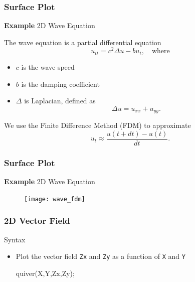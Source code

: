 \documentclass{beamer}  %
\begin{document}
\begin{frame}[fragile]
\frametitle{Surface Plot}
\textbf{Example} 2D Wave Equation

The wave equation is a partial differential equation
\begin{equation}\label{eq:wave_eq}
   u_{tt} = c^2 \Delta u - b u_t,\quad \mbox{where}
\end{equation}\pause
\begin{itemize}
    \item $c$ is the wave speed
    \item $b$ is the damping coefficient
    \item $\Delta$ is Laplacian, defined as
          \begin{equation}
          \Delta u = u_{xx} + u_{yy}.
          \end{equation}
\end{itemize}
\pause
We use the Finite Difference Method (FDM) to approximate
\begin{equation}
    u_t \approx \frac{u(t+dt) - u(t)}{dt}.
\end{equation}

\end{frame}
\begin{frame}[fragile]
\frametitle{Surface Plot}
\textbf{Example} 2D Wave Equation

\setcounter{subfigure}{0}
\begin{figure}
    \centering
   \texttt{[image: wave\_fdm]}
\end{figure}

\end{frame}
\begin{frame}[fragile]
\frametitle{2D Vector Field}
\begin{block}{Syntax}
\begin{itemize}
    \item Plot the vector field \texttt{Zx} and \texttt{Zy} as a function of \texttt{X} and \texttt{Y}
          \begin{matlabcodebeamer}[numbers=none,frame=none]
          quiver(X,Y,Zx,Zy);
          \end{matlabcodebeamer}
\end{itemize}
\end{block}

\end{frame}
\end{document}
